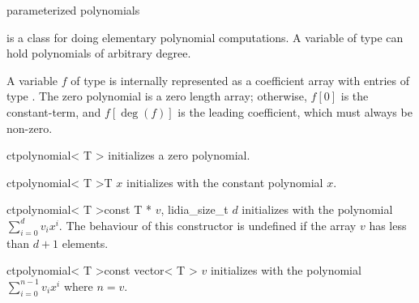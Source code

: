 

\NAME

  \dotfill parameterized polynomials



\ABSTRACT

 is a class for doing elementary polynomial computations.  A variable of
type  can hold polynomials of arbitrary degree.



\DESCRIPTION

A variable $f$ of type  is internally represented as a coefficient array
with entries of type .  The zero polynomial is a zero length array; otherwise, $f[0]$ is
the constant-term, and $f[\deg(f)]$ is the leading coefficient, which must always be non-zero.



\CONS

\begin{fcode}{ct}{polynomial< T >}{}
  initializes a zero polynomial.
\end{fcode}

\begin{fcode}{ct}{polynomial< T >}{T $x$}
  initializes with the constant polynomial $x$.
\end{fcode}

\begin{fcode}{ct}{polynomial< T >}{const T * $v$, lidia_size_t $d$}
  initializes with the polynomial $\sum_{i=0}^d v_i x^i$.  The behaviour of this constructor is
  undefined if the array $v$ has less than $d + 1$ elements.
\end{fcode}

\begin{fcode}{ct}{polynomial< T >}{const vector< T > $v$}
  initializes with the polynomial $\sum_{i=0}^{n-1} v_i x^i$ where
  $n = v$.
\end{fcode}

